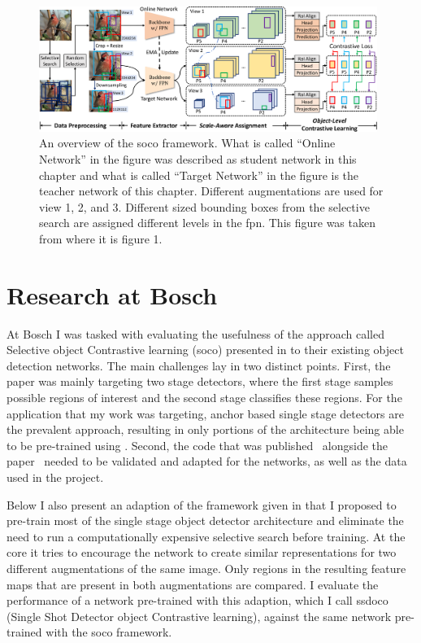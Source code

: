 \begin{figure}
	\centering
	\includegraphics[width=0.98\textwidth]{chapters/internship/images/soco.png}
	\caption[Selective object Contrastive learning]{An overview of the \acrshort{soco} framework. What is called ``Online Network'' in the figure was described as student network in this chapter and what is called ``Target Network'' in the figure is the teacher network of this chapter. Different augmentations are used for view 1, 2, and 3. Different sized bounding boxes from the selective search are assigned different levels in the \acrshort{fpn}. This figure was taken from \cite{Wei:2021aaa} where it is figure 1.}\label{fig:internship_soco}
\end{figure}


\section{Research at Bosch}
At Bosch I was tasked with evaluating the usefulness of the approach called Selective object Contrastive learning (\acrshort{soco}) presented in \cite{Wei:2021aaa} to their existing object detection networks. The main challenges lay in two distinct points. First, the paper was mainly targeting two stage detectors, where the first stage samples possible regions of interest and the second stage classifies these regions. For the application that my work was targeting, anchor based single stage detectors are the prevalent approach, resulting in only portions of the architecture being able to be pre-trained using \cite{Wei:2021aaa}. Second, the code that was published~\cite{Wei:2022aaa} alongside the paper~\cite{Wei:2021aaa} needed to be validated and adapted for the networks, as well as the data used in the project.

Below I also present an adaption of the framework given in \cite{Wei:2021aaa} that I proposed to pre-train most of the single stage object detector architecture and eliminate the need to run a computationally expensive selective search \cite{Uijlings:2013aaa} before training. At the core it tries to encourage the network to create similar representations for two different augmentations of the same image. Only regions in the resulting feature maps that are present in both augmentations are compared. I evaluate the performance of a network pre-trained with this adaption, which I call \acrshort{ssdoco} (Single Shot Detector object Contrastive learning), against the same network pre-trained with the \acrshort{soco} framework.

